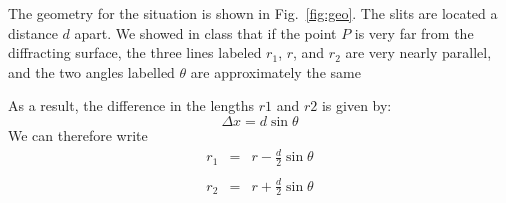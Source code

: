 \documentclass[12pt]{article}
\begin{document}
The geometry for the situation is shown in Fig.~\ref{fig:geo}.  The slits are located a distance $d$ apart.  We showed in class that if the point $P$ is very far from the diffracting surface, the three lines labeled $r_1$, $r$, and $r_2$ are very nearly parallel, and the two angles labelled $\theta$ are approximately the same

  As a result, the difference in the lengths $r1$ and $r2$ is given by:
\begin{displaymath}
\Delta x = d \sin \theta
\end{displaymath}
We can therefore write
\begin{eqnarray*}
r_1 &=& r - \frac{d}{2} \sin \theta \\ \\
r_2 &=& r + \frac{d}{2} \sin \theta \\
\end{eqnarray*}
\end{document}
